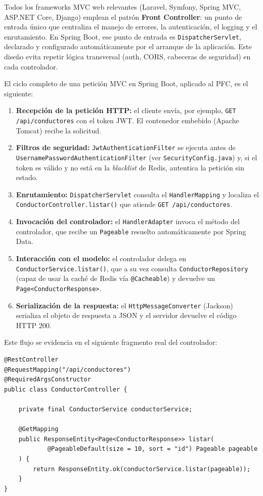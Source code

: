 Todos los frameworks MVC web relevantes (Laravel, Symfony, Spring MVC, ASP.NET Core, Django) emplean el patrón
\textbf{Front Controller}: un punto de entrada único que centraliza el manejo de errores, la autenticación, el
logging y el enrutamiento. En Spring Boot, ese punto de entrada es \texttt{DispatcherServlet}, declarado y
configurado automáticamente por el arranque de la aplicación. Este diseño evita repetir lógica transversal
(auth, CORS, cabeceras de seguridad) en cada controlador.

El ciclo completo de una petición MVC en Spring Boot, aplicado al PFC, es el siguiente:

\begin{enumerate}[label=\textbf{Paso \arabic*.}]
    \item \textbf{Recepción de la petición HTTP:} el cliente envía, por ejemplo, \texttt{GET /api/conductores}
    con el token JWT. El contenedor embebido (Apache Tomcat) recibe la solicitud.
    \item \textbf{Filtros de seguridad:} \texttt{JwtAuthenticationFilter} se ejecuta antes de
    \texttt{UsernamePasswordAuthenticationFilter} (ver \texttt{SecurityConfig.java}) y, si el token es válido y no
    está en la \textit{blacklist} de Redis, autentica la petición sin estado.
    \item \textbf{Enrutamiento:} \texttt{DispatcherServlet} consulta el \texttt{HandlerMapping} y localiza el
    \texttt{ConductorController.listar()} que atiende \texttt{GET /api/conductores}.
    \item \textbf{Invocación del controlador:} el \texttt{HandlerAdapter} invoca el método del controlador,
    que recibe un \texttt{Pageable} resuelto automáticamente por Spring Data.
    \item \textbf{Interacción con el modelo:} el controlador delega en \texttt{ConductorService.listar()}, que a su
    vez consulta \texttt{ConductorRepository} (capaz de usar la caché de Redis vía \texttt{@Cacheable}) y devuelve
    un \texttt{Page<ConductorResponse>}.
    \item \textbf{Serialización de la respuesta:} el \texttt{HttpMessageConverter} (Jackson) serializa el objeto de
    respuesta a JSON y el servidor devuelve el código HTTP 200.
\end{enumerate}

Este flujo se evidencia en el siguiente fragmento real del controlador:

\begin{lstlisting}[style=javaStyle, label=lst:c1, caption={ConductorController.java — endpoint GET /api/conductores}]
@RestController
@RequestMapping("/api/conductores")
@RequiredArgsConstructor
public class ConductorController {

    private final ConductorService conductorService;

    @GetMapping
    public ResponseEntity<Page<ConductorResponse>> listar(
            @PageableDefault(size = 10, sort = "id") Pageable pageable
    ) {
        return ResponseEntity.ok(conductorService.listar(pageable));
    }
}
\end{lstlisting}

